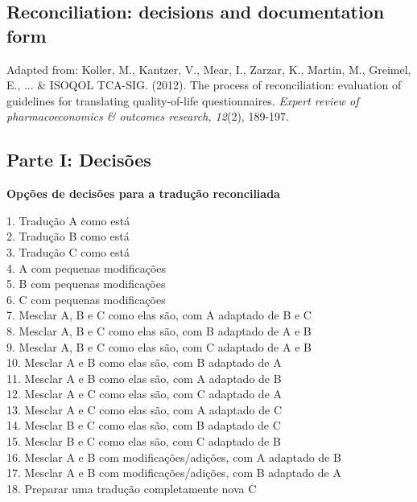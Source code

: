 \documentclass[
  ,doc,11pt, twoside,floatsintext]{apa6}
\begin{document}
\begin{appendix}
\section{Reconciliation: decisions and documentation form}
\label{appendix:form}
Adapted from: Koller, M., Kantzer, V., Mear, I., Zarzar, K., Martin, M., Greimel, E., ... \& ISOQOL TCA-SIG. (2012). The process of reconciliation: evaluation of guidelines for translating quality-of-life questionnaires. \textit{Expert review of pharmacoeconomics \& outcomes research, 12}(2), 189-197.
\begin{flushleft}
\subsection{Parte I: Decisões}

\textbf{Opções de decisões para a tradução reconciliada}

\smallskip

1.	Tradução A como está\\
2.	Tradução B como está\\
3.	Tradução C como está\\
4.	A com pequenas modificações\\
5.	B com pequenas modificações\\
6.	C com pequenas modificações\\
7.	Mesclar A, B e C como elas são, com A adaptado de B e C\\
8.	Mesclar A, B e C como elas são, com B adaptado de A e B\\
9.	Mesclar A, B e C como elas são, com C adaptado de A e B\\
10.	Mesclar A e B como elas são, com B adaptado de A\\
11.	Mesclar A e B como elas são, com A adaptado de B\\
12.	Mesclar A e C como elas são, com C adaptado de A\\
13.	Mesclar A e C como elas são, com A adaptado de C\\
14.	Mesclar B e C como elas são, com B adaptado de C\\
15.	Mesclar B e C como elas são, com C adaptado de B\\
16.	Mesclar A e B com modificações/adições, com A adaptado de B\\
17.	Mesclar A e B com modificações/adições, com B adaptado de A\\
18.	Preparar uma tradução completamente nova C

\smallskip


\end{flushleft}
\end{appendix}
\end{document}
